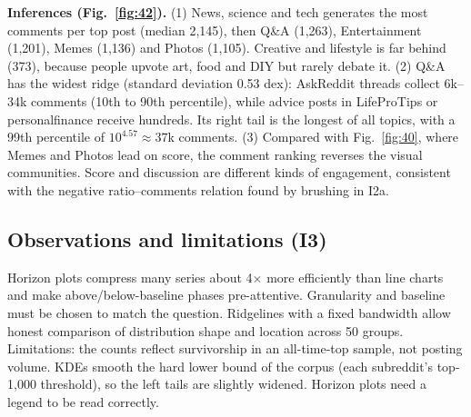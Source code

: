 
\textbf{Inferences (Fig.~\ref{fig:42}).}
(1) News, science and tech generates the most comments per top post (median 2,145), then Q\&A (1,263), Entertainment (1,201),
Memes (1,136) and Photos (1,105). Creative and lifestyle is far behind (373), because people upvote art, food and DIY but
rarely debate it.
(2) Q\&A has the widest ridge (standard deviation 0.53 dex): AskReddit threads collect 6k--34k comments (10th to 90th
percentile), while advice posts in LifeProTips or personalfinance receive hundreds. Its right tail is the longest of all
topics, with a 99th percentile of $10^{4.57}\approx37$k comments.
(3) Compared with Fig.~\ref{fig:40}, where Memes and Photos lead on score, the comment ranking reverses the visual
communities. Score and discussion are different kinds of engagement, consistent with the negative ratio--comments relation
found by brushing in I2a.

\subsection{Observations and limitations (I3)}
Horizon plots compress many series about 4$\times$ more efficiently than line charts and make above/below-baseline phases
pre-attentive. Granularity and baseline must be chosen to match the question. Ridgelines with a fixed bandwidth allow
honest comparison of distribution shape and location across 50 groups. Limitations: the counts reflect survivorship in an
all-time-top sample, not posting volume. KDEs smooth the hard lower bound of the corpus (each subreddit's top-1,000
threshold), so the left tails are slightly widened. Horizon plots need a legend to be read correctly.
